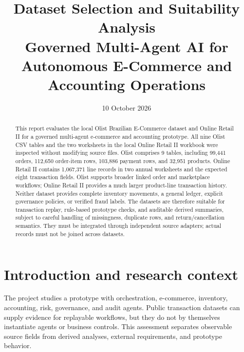 \documentclass[11pt,a4paper]{article}
\title{Dataset Selection and Suitability Analysis\\[0.4em]\large Governed Multi-Agent AI for Autonomous E-Commerce and Accounting Operations}
\author{}
\date{10 October 2026}
\begin{document}
\maketitle
\begin{abstract}
This report evaluates the local Olist Brazilian E-Commerce dataset and Online Retail II for a governed multi-agent e-commerce and accounting prototype. All nine Olist CSV tables and the two worksheets in the local Online Retail II workbook were inspected without modifying source files. Olist comprises 9 tables, including 99,441 orders, 112,650 order-item rows, 103,886 payment rows, and 32,951 products. Online Retail II contains 1,067,371 line records in two annual worksheets and the expected eight transaction fields. Olist supports broader linked order and marketplace workflows; Online Retail II provides a much larger product-line transaction history. Neither dataset provides complete inventory movements, a general ledger, explicit governance policies, or verified fraud labels. The datasets are therefore suitable for transaction replay, rule-based prototype checks, and auditable derived summaries, subject to careful handling of missingness, duplicate rows, and return/cancellation semantics. They must be integrated through independent source adapters; actual records must not be joined across datasets.
\end{abstract}

\section{Introduction and research context}
The project studies a prototype with orchestration, e-commerce, inventory, accounting, risk, governance, and audit agents. Public transaction datasets can supply evidence for replayable workflows, but they do not by themselves instantiate agents or business controls. This assessment separates observable source fields from derived analyses, external requirements, and prototype behavior.
\end{document}
